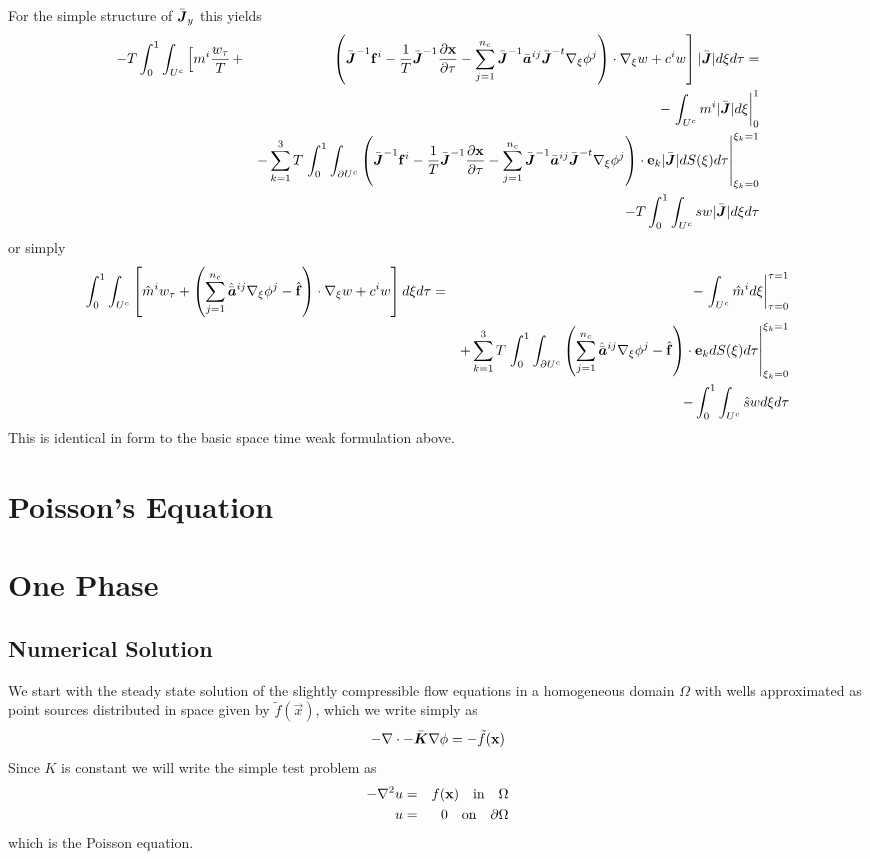 \documentclass[10pt,dvips,twoside,reqno]{amsart}
\begin{document}
For the simple structure of $\bar{\mbox{{\boldmath ${J}$}}}_y$ this yields
\begin{eqnarray}
-T\int_0^1 \int_{U^c}  \left[ m^i \frac{w_\tau}{T} \right. &+&  \left. \left( \bar{\mbox{{\boldmath ${J}$}}}^{-1} {\bf f}^i - \frac{1}{T} \bar{\mbox{{\boldmath ${J}$}}}^{-1}\frac{\partial {{\bf x}}}{\partial {\tau}} - \sum_{j=1}^{n_c} \bar{\mbox{{\boldmath ${J}$}}}^{-1} \bar{\mbox{{\boldmath ${a}$}}}^{ij} \bar{\mbox{{\boldmath ${J}$}}}^{-t} \nabla_{\xi} \phi^j  \right) \cdot  \nabla_{\xi} w + c^i w \right] |\bar{\mbox{{\boldmath ${J}$}}}| d\xi d\tau = \\
&& -\left. \int_{U^c} m^i |\bar{\mbox{{\boldmath ${J}$}}}| d\xi \right|_0^1 \\
&& -\sum_{k=1}^3 T \left. \int_0^1 \int_{\partial U^c} \left( \bar{\mbox{{\boldmath ${J}$}}}^{-1} {\bf f}^i - \frac{1}{T} \bar{\mbox{{\boldmath ${J}$}}}^{-1}\frac{\partial {{\bf x}}}{\partial {\tau}} - \sum_{j=1}^{n_c} \bar{\mbox{{\boldmath ${J}$}}}^{-1} \bar{\mbox{{\boldmath ${a}$}}}^{ij} \bar{\mbox{{\boldmath ${J}$}}}^{-t} \nabla_{\xi} \phi^j  \right) \cdot {\bf e}_k |\bar{\mbox{{\boldmath ${J}$}}}| dS(\xi)d\tau \right|_{\xi_k=0}^{\xi_k=1}\nonumber \\
&& -  T \int_0^1 \int_{U^c} sw |\bar{\mbox{{\boldmath ${J}$}}}| d\xi d\tau
\end{eqnarray}
or simply
\begin{eqnarray}
\int_0^1 \int_{U^c}  \left[ \hat{m}^i w_\tau + \left( \sum_{j=1}^{n_c} \hat{\bar{\mbox{{\boldmath ${a}$}}}}^{ij} \nabla_{\xi} \phi^j  - \hat{{\bf f}} \right) \cdot  \nabla_{\xi} w + c^i w \right] d\xi d\tau &=& -\left. \int_{U^c} \hat{m}^i d\xi \right|_{\tau=0}^{\tau=1} \nonumber \\
&& + \sum_{k=1}^3 T \left. \int_0^1 \int_{\partial U^c} \left( \sum_{j=1}^{n_c} \hat{\bar{\mbox{{\boldmath ${a}$}}}}^{ij} \nabla_{\xi} \phi^j  - \hat{{\bf f}} \right) \cdot {\bf e}_k dS(\xi)d\tau \right|_{\xi_k=0}^{\xi_k=1}\nonumber \\
&& - \int_0^1 \int_{U^c} \hat{s} w d\xi d\tau
\end{eqnarray}
This is identical in form to the basic space time weak formulation above. 
\section{Poisson's Equation}

\section{One Phase}

\subsection{Numerical Solution}

We start with the steady state solution of the slightly compressible flow equations in a homogeneous domain $\Omega$ with wells approximated as point sources distributed in space given by $\tilde{f}(\vec x)$, which we write simply as
\begin{equation}
-\nabla \cdot -\bar{\mbox{{\boldmath ${K}$}}} \nabla \phi = -\tilde{f} ({\bf x})
\end{equation}
Since $K$ is constant we will write the simple test problem as
\begin{eqnarray}
-\nabla^2 u &=& f ({\bf x}) \quad \mbox{in} \quad \Omega\\
u &=& 0 \quad \mbox{on} \quad \partial \Omega
\end{eqnarray}
which is the Poisson equation. 
\end{document}
